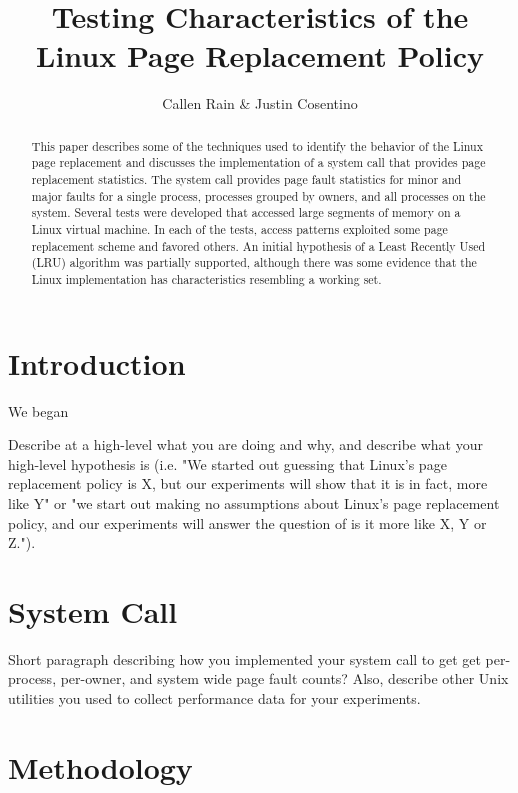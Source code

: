 \documentclass[twocolumn]{article}
\begin{document}
\title{Testing Characteristics of the Linux Page Replacement Policy}

\author{Callen Rain \& Justin Cosentino}

\maketitle

\begin{abstract}
This paper describes some of the techniques used to identify the behavior of the Linux page replacement and discusses the implementation of a system call that provides page replacement statistics.  The system call provides page fault statistics for minor and major faults for a single process, processes grouped by owners, and all processes on the system. Several tests were developed that accessed large segments of memory on a Linux virtual machine. In each of the tests, access patterns exploited some page replacement scheme and favored others. An initial hypothesis of a Least Recently Used (LRU) algorithm was partially supported, although there was some evidence that the Linux implementation has characteristics resembling a working set. 
\end{abstract}

\section{Introduction}

We began 

 Describe at a high-level what you are doing and why, and describe what your high-level hypothesis is (i.e. "We started out guessing that Linux's page replacement policy is X, but our experiments will show that it is in fact, more like Y" or "we start out making no assumptions about Linux's page replacement policy, and our experiments will answer the question of is it more like X, Y or Z.").

\section{System Call}
Short paragraph describing how you implemented your system call to get get per-process, per-owner, and system wide page fault counts? Also, describe other Unix utilities you used to collect performance data for your experiments.

\section{Methodology}
\end{document}
